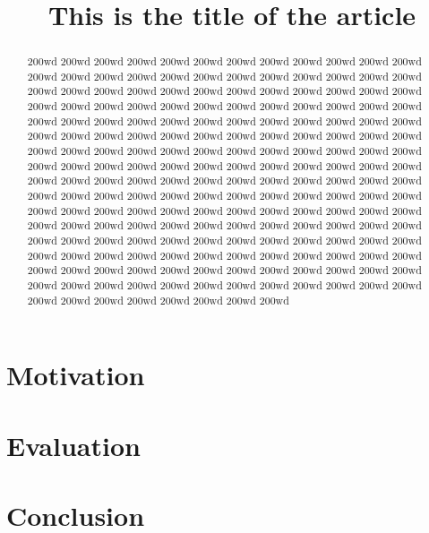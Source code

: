 \documentclass{sig-alternate}
\title{This is the title of the article}
\author{}
\begin{document}
\maketitle
\thispagestyle{firstpage}
\pagestyle{plain}

\begin{abstract}

200wd 200wd 200wd 200wd 200wd 200wd 200wd 200wd 200wd 200wd 200wd 200wd 200wd 200wd 200wd 200wd 200wd 200wd 200wd 200wd 200wd 200wd 200wd 200wd 200wd 200wd 200wd 200wd 200wd 200wd 200wd 200wd 200wd 200wd 200wd 200wd 200wd 200wd 200wd 200wd 200wd 200wd 200wd 200wd 200wd 200wd 200wd 200wd 200wd 200wd 200wd 200wd 200wd 200wd 200wd 200wd 200wd 200wd 200wd 200wd 200wd 200wd 200wd 200wd 200wd 200wd 200wd 200wd 200wd 200wd 200wd 200wd 200wd 200wd 200wd 200wd 200wd 200wd 200wd 200wd 200wd 200wd 200wd 200wd 200wd 200wd 200wd 200wd 200wd 200wd 200wd 200wd 200wd 200wd 200wd 200wd 200wd 200wd 200wd 200wd 200wd 200wd 200wd 200wd 200wd 200wd 200wd 200wd 200wd 200wd 200wd 200wd 200wd 200wd 200wd 200wd 200wd 200wd 200wd 200wd 200wd 200wd 200wd 200wd 200wd 200wd 200wd 200wd 200wd 200wd 200wd 200wd 200wd 200wd 200wd 200wd 200wd 200wd 200wd 200wd 200wd 200wd 200wd 200wd 200wd 200wd 200wd 200wd 200wd 200wd 200wd 200wd 200wd 200wd 200wd 200wd 200wd 200wd 200wd 200wd 200wd 200wd 200wd 200wd 200wd 200wd 200wd 200wd 200wd 200wd 200wd 200wd 200wd 200wd 200wd 200wd 200wd 200wd 200wd 200wd 200wd 200wd 200wd 200wd 200wd 200wd 200wd 200wd 200wd 200wd 200wd 200wd 200wd 200wd 200wd 200wd 200wd 200wd 200wd 200wd

\end{abstract}



\section{Motivation}

\section{Evaluation}

\section{Conclusion}




\end{document}
